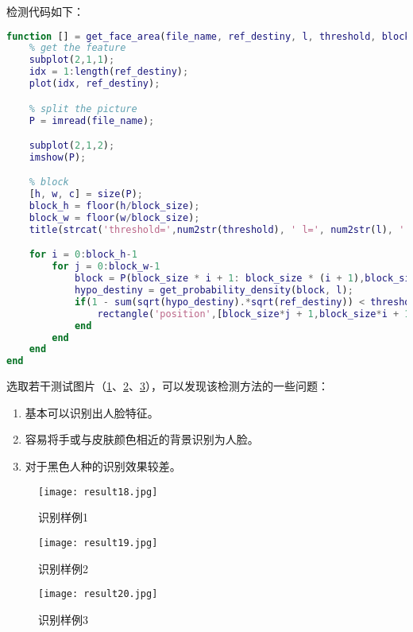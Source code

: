 \documentclass[a4paper]{article}
\begin{document}
\par 检测代码如下：
\begin{lstlisting}[language=matlab, caption=人脸检测]
function [] = get_face_area(file_name, ref_destiny, l, threshold, block_size)
    % get the feature
    subplot(2,1,1);
    idx = 1:length(ref_destiny);
    plot(idx, ref_destiny);

    % split the picture
    P = imread(file_name);

    subplot(2,1,2);
    imshow(P);

    % block
    [h, w, c] = size(P);
    block_h = floor(h/block_size);
    block_w = floor(w/block_size);
    title(strcat('threshold=',num2str(threshold), ' l=', num2str(l), ' block-size=', num2str(block_size)));

    for i = 0:block_h-1
        for j = 0:block_w-1
            block = P(block_size * i + 1: block_size * (i + 1),block_size * j + 1:block_size * (j + 1),:); % get the block
            hypo_destiny = get_probability_density(block, l);
            if(1 - sum(sqrt(hypo_destiny).*sqrt(ref_destiny)) < threshold)
                rectangle('position',[block_size*j + 1,block_size*i + 1,block_size,block_size],'EdgeColor','r');
            end
        end
    end
end
\end{lstlisting}

\par 选取若干测试图片（\ref{fig:result 18}、\ref{fig:result 19}、\ref{fig:result 20}），可以发现该检测方法的一些问题：
\begin{enumerate}
    \item 基本可以识别出人脸特征。
    \item 容易将手或与皮肤颜色相近的背景识别为人脸。
    \item 对于黑色人种的识别效果较差。
\end{enumerate}

\begin{figure}[ht]
    \centering
    \texttt{[image: result18.jpg]}
    \caption{识别样例1}
    \label{fig:result 18}
\end{figure}

\begin{figure}[ht]
    \centering
    \texttt{[image: result19.jpg]}
    \caption{识别样例2}
    \label{fig:result 19}
\end{figure}

\begin{figure}[ht]
    \centering
    \texttt{[image: result20.jpg]}
    \caption{识别样例3}
    \label{fig:result 20}
\end{figure}
\end{document}
